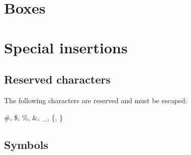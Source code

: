 \documentclass[11pt]{article}
\begin{document}
\section{Boxes}%
\section{Special insertions}
\subsection{Reserved characters}
The following characters are reserved and must be escaped:
\begin{center}
    \#, \$, \%, \&, \_, \{, \}
\end{center}

\subsection{Symbols}
\end{document}
